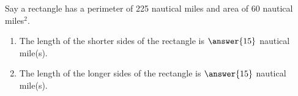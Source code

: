 \documentclass{ximera}
\author{Kenneth Berglund}
\begin{document}
\begin{exercise}
Say a rectangle has a perimeter of 225 nautical miles and area of 60 nautical miles$^2$.  

\begin{enumerate}
\item The length of the shorter sides of the rectangle is $\answer{15}$ nautical mile(s).
\item The length of the longer sides of the rectangle is $\answer{15}$ nautical mile(s).
\end{enumerate}

\end{exercise}
\end{document}
